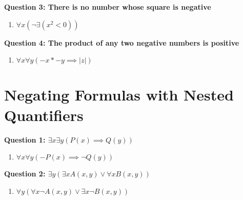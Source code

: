 \documentclass[11pt]{article}
\begin{document}
\begin{enumerate}
\begin{enumerate}[label=(\alph*)]
\end{enumerate}

\textbf{Question 3: There is no number whose square is negative}
\begin{enumerate}[label=(\alph*)]
\item
$\forall x(\neg \exists (x^2 < 0 ))$

\end{enumerate}

\textbf{Question 4: The product of any two negative numbers is positive}
\begin{enumerate}[label=(\alph*)]
\item
$\forall x \forall y(-x * -y \implies |z|)$

\end{enumerate}

\section{\textbf{Negating Formulas with Nested Quantifiers}}
\textbf{Question 1: $\exists x \exists y (P(x) \implies Q(y))$}
\begin{enumerate}[label=(\alph*)]
\item
$\forall x \forall y(-P(x) \implies \neg Q(y))$

\end{enumerate}

\textbf{Question 2: $\exists y (\exists x A(x, y) \lor \forall x B(x, y))$}
\begin{enumerate}[label=(\alph*)]
\item
$\forall y (\forall x \neg A(x, y) \lor \exists x \neg B(x, y))$

\end{enumerate}

\end{enumerate}
\end{document}
